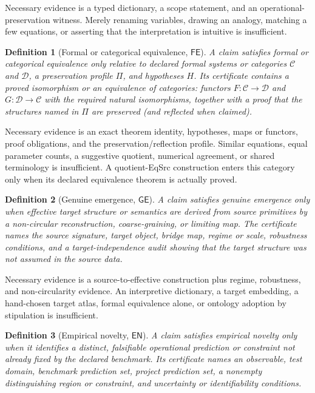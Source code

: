 \documentclass[11pt]{article}
\newtheorem{definition}{Definition}
\newcommand{\FE}{\mathsf{FE}}
\newcommand{\GE}{\mathsf{GE}}
\newcommand{\EN}{\mathsf{EN}}
\begin{document}
Necessary evidence is a typed dictionary, a scope statement, and an
operational-preservation witness.  Merely renaming variables, drawing an
analogy, matching a few equations, or asserting that the interpretation is
intuitive is insufficient.

\begin{definition}[Formal or categorical equivalence, \texorpdfstring{$\FE$}{FE}]
A claim satisfies \emph{formal or categorical equivalence} only relative to
declared formal systems or categories $\mathcal C$ and $\mathcal D$, a
preservation profile $\Pi$, and hypotheses $H$.  Its certificate contains a
proved isomorphism or an equivalence of categories: functors
$F\colon\mathcal C\to\mathcal D$ and $G\colon\mathcal D\to\mathcal C$
with the required natural isomorphisms, together with a proof that the
structures named in $\Pi$ are preserved (and reflected when claimed).
\end{definition}

Necessary evidence is an exact theorem identity, hypotheses, maps or functors,
proof obligations, and the preservation/reflection profile.  Similar
equations, equal parameter counts, a suggestive quotient, numerical agreement,
or shared terminology is insufficient.  A quotient-EqSrc construction enters
this category only when its declared equivalence theorem is actually proved.

\begin{definition}[Genuine emergence, \texorpdfstring{$\GE$}{GE}]
A claim satisfies \emph{genuine emergence} only when effective target
structure or semantics are derived from source primitives by a non-circular
reconstruction, coarse-graining, or limiting map.  The certificate names the
source signature, target object, bridge map, regime or scale, robustness
conditions, and a target-independence audit showing that the target structure
was not assumed in the source data.
\end{definition}

Necessary evidence is a source-to-effective construction plus regime,
robustness, and non-circularity evidence.  An interpretive dictionary, a
target embedding, a hand-chosen target atlas, formal equivalence alone, or
ontology adoption by stipulation is insufficient.

\begin{definition}[Empirical novelty, \texorpdfstring{$\EN$}{EN}]
A claim satisfies \emph{empirical novelty} only when it identifies a distinct,
falsifiable operational prediction or constraint not already fixed by the
declared benchmark.  Its certificate names an observable, test domain,
benchmark prediction set, project prediction set, a nonempty distinguishing
region or constraint, and uncertainty or identifiability conditions.
\end{definition}
\end{document}
